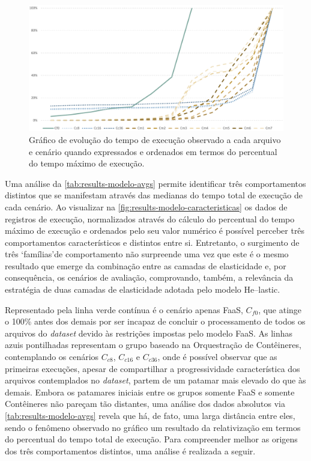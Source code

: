\documentclass[english,brazilian]{UNISINOSmonografia} %
\newcommand\defaultFigureWidth{0.9}
\begin{document}
\begin{figure}[bt]
	\centering%
	\begin{minipage}{\defaultFigureWidth\textwidth}
		\caption{Gráfico de evolução do tempo de execução observado a cada arquivo e cenário quando expressados e ordenados em termos do percentual do tempo máximo de execução.}
		\label{fig:results-modelo-caracteristicas}
		\vspace{1ex}
		\includegraphics[width=\textwidth]{results-modelo-caracteristicas}
	\end{minipage}
\end{figure}


Uma análise da \autoref{tab:results-modelo-avgs} permite identificar três comportamentos distintos que se manifestam através das medianas do tempo total de execução de cada cenário.
%
Ao visualizar na \autoref{fig:results-modelo-caracteristicas} os dados de registros de execução, normalizados através do cálculo do percentual do tempo máximo de execução e ordenados pelo seu valor numérico é possível perceber três comportamentos característicos e distintos entre si.
%
Entretanto, o surgimento de três \textquoteleft famílias\textquoteright de comportamento não surpreende uma vez que este é o mesmo resultado que emerge da combinação entre as camadas de elasticidade e, por consequência, os cenários de avaliação, comprovando, também, a relevância da estratégia de duas camadas de elasticidade adotada pelo modelo \textsf{He}--lastic.



Representado pela linha verde contínua é o cenário apenas FaaS, $C_{f0}$, que atinge o 100\% antes dos demais por ser incapaz de concluir o processamento de todos os arquivos do \textit{dataset} devido às restrições impostas pelo modelo FaaS.
%
As linhas azuis pontilhadas representam o grupo baseado na Orquestração de Contêineres, contemplando os cenários {$C_{c8}$, $C_{c16}$ e $C_{c36}$}, onde é possível observar que as primeiras execuções, apesar de compartilhar a progressividade característica dos arquivos contemplados no \textit{dataset}, partem de um patamar mais elevado do que às demais.
%
Embora os patamares iniciais entre os grupos somente FaaS e somente Contêineres não pareçam tão distantes, uma análise dos dados absolutos via \autoref{tab:results-modelo-avgs} revela que há, de fato, uma larga distância entre eles, sendo o fenômeno observado no gráfico um resultado da relativização em termos do percentual do tempo total de execução.
%
Para compreender melhor as origens dos três comportamentos distintos, uma análise é realizada a seguir.
\end{document}
